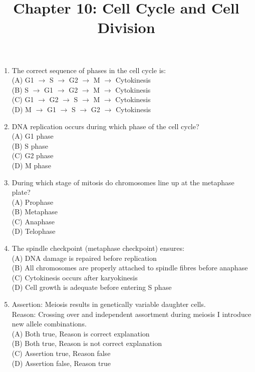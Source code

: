 \documentclass{article}
\begin{document}
\title{Chapter 10: Cell Cycle and Cell Division}
\date{}
\maketitle

\begin{enumerate}[label=Q\arabic*.]

\item The correct sequence of phases in the cell cycle is:
\\(A) G1 $\rightarrow$ S $\rightarrow$ G2 $\rightarrow$ M $\rightarrow$ Cytokinesis
\\(B) S $\rightarrow$ G1 $\rightarrow$ G2 $\rightarrow$ M $\rightarrow$ Cytokinesis
\\(C) G1 $\rightarrow$ G2 $\rightarrow$ S $\rightarrow$ M $\rightarrow$ Cytokinesis
\\(D) M $\rightarrow$ G1 $\rightarrow$ S $\rightarrow$ G2 $\rightarrow$ Cytokinesis

\item DNA replication occurs during which phase of the cell cycle?
\\(A) G1 phase
\\(B) S phase
\\(C) G2 phase
\\(D) M phase

\item During which stage of mitosis do chromosomes line up at the metaphase plate?
\\(A) Prophase
\\(B) Metaphase
\\(C) Anaphase
\\(D) Telophase

\item The spindle checkpoint (metaphase checkpoint) ensures:
\\(A) DNA damage is repaired before replication
\\(B) All chromosomes are properly attached to spindle fibres before anaphase
\\(C) Cytokinesis occurs after karyokinesis
\\(D) Cell growth is adequate before entering S phase

\item Assertion: Meiosis results in genetically variable daughter cells.\\
Reason: Crossing over and independent assortment during meiosis I introduce new allele combinations.
\\(A) Both true, Reason is correct explanation
\\(B) Both true, Reason is not correct explanation
\\(C) Assertion true, Reason false
\\(D) Assertion false, Reason true


\end{enumerate}
\end{document}
